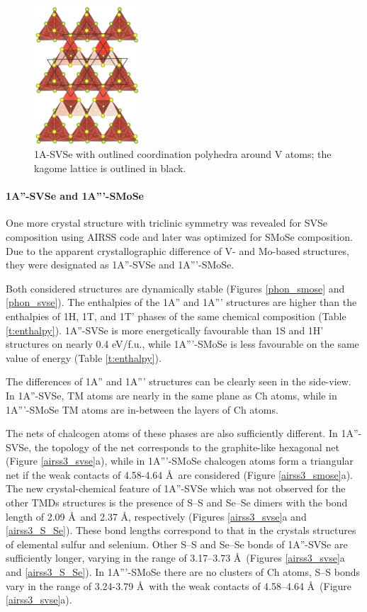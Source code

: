 \documentclass[a4paperm]{article}
\begin{document}
\begin{figure}[H]
        \includegraphics[width=0.35\textwidth]{airss1_v_poly.png}
        \caption{1A-SVSe with outlined coordination polyhedra around V atoms; the kagome lattice is outlined in black.}
\label{airss1_poly}
\end{figure}




\paragraph{1A''-SVSe and 1A'''-SMoSe}
One more crystal structure with triclinic symmetry was revealed for SVSe composition using AIRSS code and later was optimized for SMoSe composition.
Due to the apparent crystallographic difference of V- and Mo-based structures, they were designated as 1A''-SVSe and 1A'''-SMoSe.


Both considered structures are dynamically stable (Figures \ref{phon_smose} and \ref{phon_svse}).
The enthalpies of the 1A'' and 1A''' structures are higher than the enthalpies of 1H, 1T, and 1T' phases of the same chemical composition (Table \ref{t:enthalpy}).
1A''-SVSe is more energetically favourable than 1S and 1H' structures on nearly 0.4 eV/f.u., while 1A'''-SMoSe is less favourable on the same value of energy (Table \ref{t:enthalpy}).


The differences of 1A'' and 1A''' structures can be clearly seen in the side-view.
In 1A''-SVSe, TM atoms are nearly in the same plane as Ch atoms, while in 1A'''-SMoSe TM atoms are in-between the layers of Ch atoms.

The nets of chalcogen atoms of these phases are also sufficiently different.
In 1A''-SVSe, the topology of the net corresponds to the graphite-like hexagonal net (Figure \ref{airss3_svse}a), while in 1A'''-SMoSe chalcogen atoms form a triangular net if the weak contacts of 4.58-4.64 \AA\ are considered (Figure \ref{airss3_smose}a).
The new crystal-chemical feature of 1A''-SVSe which was not observed for the other TMDs structures is the presence of S--S and Se--Se dimers with the bond length of 2.09 \AA\ and 2.37 \AA, respectively (Figures \ref{airss3_svse}a and \ref{airss3_S_Se}).
These bond lengths correspond to that in the crystals structures of elemental sulfur and selenium.
Other S--S and Se--Se bonds of 1A''-SVSe are  sufficiently longer, varying in the range of 3.17--3.73 \AA\ (Figures \ref{airss3_svse}a and \ref{airss3_S_Se}).
In 1A'''-SMoSe there are no clusters of Ch atoms, S--S bonds vary in the range of 3.24-3.79 \AA\ with the weak contacts of 4.58--4.64 \AA\ (Figure \ref{airss3_svse}a).
\end{document}

